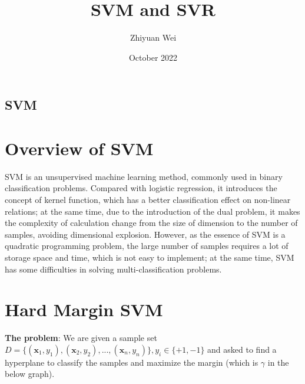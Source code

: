 \documentclass{article}
\title{SVM and SVR}
\author{Zhiyuan Wei}
\date{October 2022}
\begin{document}
\maketitle

\setlength{\parskip}{1em}

\newpage

\tableofcontents

\newpage

\begin{center}
\section*{\textbf{{\Huge SVM}}}
\end{center}

\hspace*{\fill}

\maketitle

\section{Overview of SVM}

SVM is an unsupervised machine learning method, commonly used in binary classification problems. Compared with logistic regression, it introduces the concept of kernel function, which has a better classification effect on non-linear relations; at the same time, due to the introduction of the dual problem, it makes the complexity of calculation change from the size of dimension to the number of samples, avoiding dimensional explosion. However, as the essence of SVM is a quadratic programming problem, the large number of samples requires a lot of storage space and time, which is not easy to implement; at the same time, SVM has some difficulties in solving multi-classification problems.

\section{Hard Margin SVM}

\textbf{The problem}: We are given a sample set $D = \{(\mathbf{x}_1, y_1),(\mathbf{x}_2, y_2),...,(\mathbf{x}_n, y_n)\}, y_i \in \{+1, -1\}$ and asked to find a hyperplane to classify the samples and maximize the margin (which is $\gamma$ in the below graph).
\end{document}
